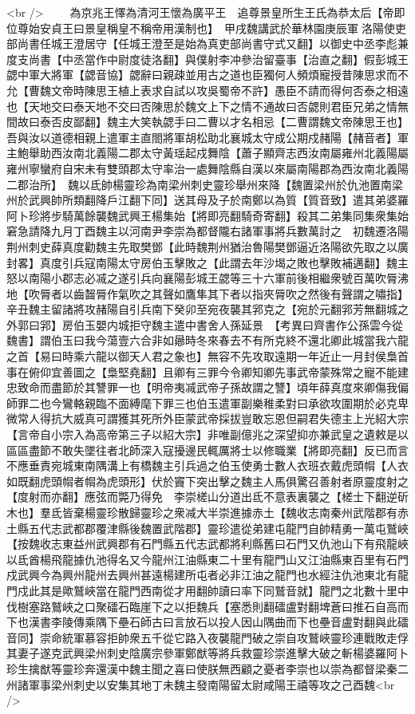 <br />
　　為京兆王懌為清河王懷為廣平王　追尊景皇所生王氏為恭太后【帝即位尊始安貞王曰景皇稱皇不稱帝用漢制也】　甲戌魏講武於華林園庚辰軍洛陽使吏部尚書任城王澄居守【任城王澄至是始為真吏部尚書守式又翻】以御史中丞李彪兼度支尚書【中丞當作中尉度徒洛翻】與僕射李冲參治留臺事【治直之翻】假彭城王勰中軍大將軍【勰音協】勰辭曰親疎並用古之道也臣獨何人頻煩寵授昔陳思求而不允【曹魏文帝時陳思王植上表求自試以攻吳蜀帝不許】愚臣不請而得何否泰之相遠也【天地交曰泰天地不交曰否陳思於魏文上下之情不通故曰否勰則君臣兄弟之情無間故曰泰否皮鄙翻】魏主大笑執勰手曰二曹以才名相忌【二曹謂魏文帝陳思王也】吾與汝以道德相親上遣軍主直閤將軍胡松助北襄城太守成公期戍赭陽【赭音者】軍主鮑舉助西汝南北義陽二郡太守黃瑶起戍舞陰【蕭子顯齊志西汝南屬雍州北義陽屬雍州寧蠻府自宋未有雙頭郡太守率治一處舞陰縣自漢以來屬南陽郡為西汝南北義陽二郡治所】　魏以氐帥楊靈珍為南梁州刺史靈珍舉州來降【魏置梁州於仇池置南梁州於武興帥所類翻降戶江翻下同】送其母及子於南鄭以為質【質音致】遣其弟婆羅阿卜珍將步騎萬餘襲魏武興王楊集始【將即亮翻騎奇寄翻】殺其二弟集同集衆集始窘急請降九月丁酉魏主以河南尹李崇為都督隴右諸軍事將兵數萬討之　初魏遷洛陽荆州刺史薛真度勸魏主先取樊鄧【此時魏荆州猶治魯陽樊鄧逼近洛陽欲先取之以廣封畧】真度引兵寇南陽太守房伯玉擊敗之【此謂去年沙堨之敗也擊敗補邁翻】魏主怒以南陽小郡志必㓕之遂引兵向襄陽彭城王勰等三十六軍前後相繼衆號百萬吹脣沸地【吹脣者以齒齧脣作氣吹之其聲如鷹隼其下者以指夾脣吹之然後有聲謂之嘯指】辛丑魏主留諸將攻赭陽自引兵南下癸卯至宛夜襲其郛克之【宛於元翻郛芳無翻城之外郭曰郛】房伯玉嬰内城拒守魏主遣中書舍人孫延景　【考異曰齊書作公孫雲今從魏書】謂伯玉曰我今蕩壹六合非如曏時冬來春去不有所克終不還北卿此城當我六龍之首【易曰時乘六龍以御天人君之象也】無容不先攻取遠期一年近止一月封侯梟首事在俯仰宜善圖之【梟堅堯翻】且卿有三罪今令卿知卿先事武帝蒙殊常之寵不能建忠致命而盡節於其讐罪一也【明帝夷㓕武帝子孫故謂之讐】頃年薛真度來卿傷我偏師罪二也今鸞輅親臨不面縛麾下罪三也伯玉遣軍副樂稚柔對曰承欲攻圍期於必克卑微常人得抗大威真可謂獲其死所外臣蒙武帝採拔豈敢忘恩但嗣君失德主上光紹大宗【言帝自小宗入為高帝第三子以紹大宗】非唯副億兆之深望抑亦兼武皇之遺敕是以區區盡節不敢失墜往者北師深入寇擾邊民輒厲將士以修職業【將即亮翻】反已而言不應垂責宛城東南隅溝上有橋魏主引兵過之伯玉使勇士數人衣班衣戴虎頭㡌【人衣如既翻虎頭㡌者㡌為虎頭形】伏於竇下突出擊之魏主人馬俱驚召善射者原靈度射之【度射而亦翻】應弦而斃乃得免　李崇槎山分道出氐不意表裏襲之【槎士下翻逆斫木也】羣氐皆棄楊靈珍散歸靈珍之衆减大半崇進據赤土【魏收志南秦州武階郡有赤土縣五代志武都郡覆津縣後魏置武階郡】靈珍遣從弟建屯龍門自帥精勇一萬屯鷲峽【按魏收志東益州武興郡有石門縣五代志武都將利縣舊曰石門又仇池山下有飛龍峽以氐酋楊飛龍據仇池得名又今龍州江油縣東二十里有龍門山又江油縣東百里有石門戍武興今為興州龍州去興州甚遠楊建所屯者必非江油之龍門也水經注仇池東北有龍門戍此其是歟鷲峽當在龍門西南從才用翻帥讀曰率下同鷲音就】龍門之北數十里中伐樹塞路鷲峽之口聚礌石臨崖下之以拒魏兵【塞悉則翻礌盧對翻埤蒼曰推石自高而下也漢書李陵傳乘隅下壘石師古曰言放石以投人因山隅曲而下也壘音盧對翻與此礌音同】崇命統軍慕容拒帥衆五千從它路入夜襲龍門破之崇自攻鷲峽靈珍連戰敗走俘其妻子遂克武興梁州刺史陰廣宗參軍鄭猷等將兵救靈珍崇進擊大破之斬楊婆羅阿卜珍生擒猷等靈珍奔還漢中魏主聞之喜曰使朕無西顧之憂者李崇也以崇為都督梁秦二州諸軍事梁州刺史以安集其地丁未魏主發南陽留太尉咸陽王禧等攻之己酉魏<br />
